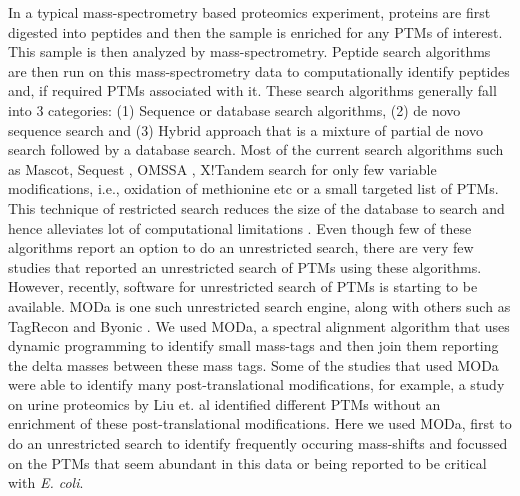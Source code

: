 \documentclass[12pt]{article}
\begin{document}
In a typical mass-spectrometry based proteomics experiment, proteins are first digested into peptides and then the sample is enriched for any PTMs of interest. This sample is then analyzed by mass-spectrometry. Peptide search algorithms are then run on this mass-spectrometry data to computationally identify peptides and, if required PTMs associated with it. These search algorithms generally fall into 3 categories: (1) Sequence or database search algorithms, (2) de novo sequence search and (3) Hybrid approach that is a mixture of partial de novo search followed by a database search. Most of the current search algorithms such as Mascot\cite{Perkinsetal1999}, Sequest \cite{Engetal1994}, OMSSA \cite{Geeretal2004}, X!Tandem \cite{CraigBeavis2004} search for only few variable modifications, i.e., oxidation of methionine etc or a small targeted list of PTMs. This technique of restricted search reduces the size of the database to search and hence alleviates lot of computational limitations \cite{McHughArthur2008}. Even though few of these algorithms report an option to do an unrestricted search, there are very few studies that reported an unrestricted search of PTMs using these algorithms. However, recently, software for unrestricted search of PTMs is starting to be available. MODa \cite{Naetal2012} is one such unrestricted search engine, along with others such as TagRecon\cite{Dasarietal2010} and Byonic \cite{Bernetal2012}. We used MODa, a spectral alignment algorithm that uses dynamic programming to identify small mass-tags and then join them reporting the delta masses between these mass tags. Some of the studies that used MODa were able to identify many post-translational modifications, for example, a study on urine proteomics by Liu et. al \cite{Liuetal2013} identified different PTMs without an enrichment of these post-translational modifications. Here we used MODa, first to do an unrestricted search to identify frequently occuring mass-shifts and focussed on the PTMs that seem abundant in this data or being reported to be critical with \emph{E. coli}. 
\end{document}
